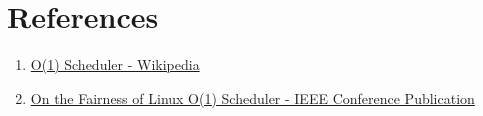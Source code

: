 \documentclass[11pt]{article}
\begin{document}
\vspace{6mm}

\section{References}
\begin{enumerate}
    \item 
    \href{https://en.wikipedia.org/wiki/O(1)_scheduler}{O(1) Scheduler - Wikipedia}
    \item
    \href{https://ieeexplore.ieee.org/document/7280991}{On the Fairness of Linux O(1) Scheduler - IEEE Conference Publication}
\end{enumerate}
\end{document}
